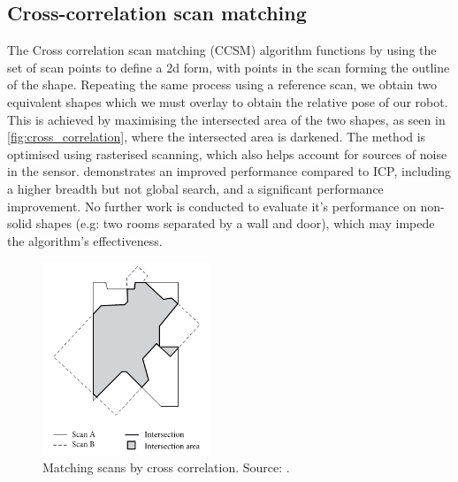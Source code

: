 \documentclass[authoryearcitations]{UoYCSproject}
\begin{document}
\subsection{Cross-correlation scan matching}
The Cross correlation scan matching (CCSM) algorithm functions by using the set of scan points to define a 2d form, with points in the scan forming the outline of the shape. Repeating the same process using a reference scan, we obtain two equivalent shapes which we must overlay to obtain the relative pose of our robot. This is achieved by maximising the intersected area of the two shapes, as seen in \autoref{fig:cross_correlation}, where the intersected area is darkened. The method is optimised using rasterised scanning, which also helps account for sources of noise in the sensor. \citet{Konecny2016-zv} demonstrates an improved performance compared to ICP, including a higher breadth but not global search, and a significant performance improvement. No further work is conducted to evaluate it's performance on non-solid shapes (e.g: two rooms separated by a wall and door), which may impede the algorithm's effectiveness. 

\begin{figure}[t]
	\centering
	\includegraphics[width=5cm,keepaspectratio]{images/cross_correlation.png}
	\caption[Cross correlation scan matching]{Matching scans by cross correlation. Source: \citet{Konecny2016-zv}.}
	\label{fig:cross_correlation}
\end{figure}
\end{document}

